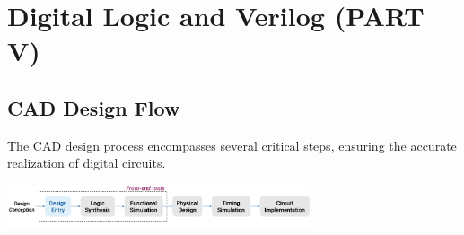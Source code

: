 \documentclass[12pt,openany, tikz,border=10pt]{book}
\begin{document}
			      	\chapter{Digital Logic and Verilog (PART V)}
			      	
			      	\section{CAD Design Flow}
			      	The CAD design process encompasses several critical steps, ensuring the accurate realization of digital circuits. 
			      	
			      	\begin{center}
			      		\includegraphics[width=0.67\textwidth]{circuits/10.1.png}
			      	\end{center}
			      	
			      	
			      	
\end{document}
